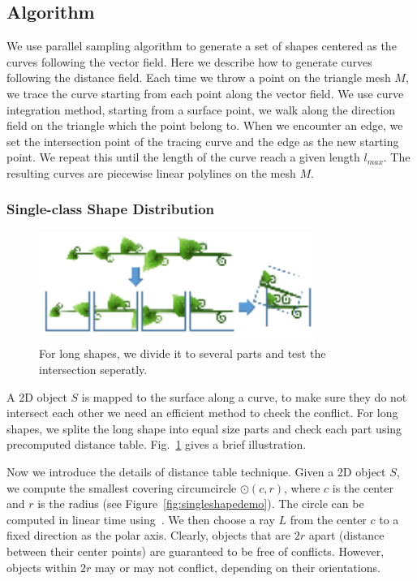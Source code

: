 \subsection{Algorithm}
We use parallel sampling algorithm to generate a set of shapes centered as the curves following the vector field.
Here we describe how to generate curves following the distance field. Each time we throw a point on the triangle mesh $M$, we trace the curve starting from each point along the vector field. We use curve integration method, starting from a surface point, we walk along the direction field on the triangle which the point belong to. When we encounter an edge, we set the intersection point of the tracing curve and the edge as the new starting point. We repeat this until the length of the curve reach a given length $l_{max}$. The resulting curves are piecewise linear polylines on the mesh $M$.

\subsubsection{Single-class Shape Distribution} \label{sec:single_shape_distribution}

\begin{figure}[htbp]
\centering
\includegraphics[width=0.8\textwidth]{figs/asd/shape_cut_1.png}
\caption{For long shapes, we divide it to several parts and test the intersection seperatly.}
\label{fig:shape_cut}
\end{figure}

A 2D object $S$ is mapped to the surface along a curve,
to make sure they do not intersect each other we need an efficient method
to check the conflict. For long shapes, we splite the long shape into equal size parts and check each part using precomputed distance table. Fig.~\ref{fig:shape_cut} gives a brief illustration.

Now we introduce the details of distance table technique.
Given a 2D object $S$, we compute the smallest covering circumcircle
$\odot(c,r)$, where $c$ is the center and $r$ is the radius (see
Figure~\ref{fig:singleshapedemo}). The circle can be computed in
linear time using~\cite{Megiddo:1982:LAL:1382436.1382771}. We then
choose a ray $L$ from the center $c$ to a fixed direction as the
polar axis. Clearly, objects that are $2r$ apart (distance between
their center points) are guaranteed to be free of conflicts.
However, objects within $2r$ may or may not conflict, depending on
their orientations.

